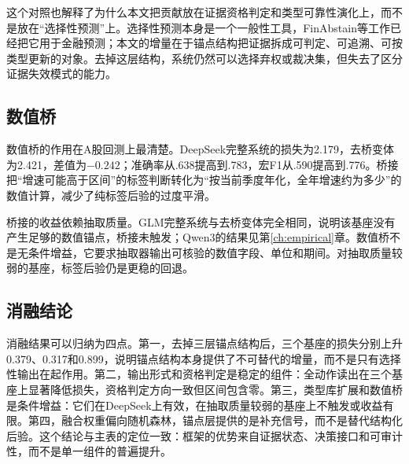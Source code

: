这个对照也解释了为什么本文把贡献放在证据资格判定和类型可靠性演化上，而不是放在“选择性预测”上。选择性预测本身是一个一般性工具，FinAbstain等工作已经把它用于金融预测；本文的增量在于锚点结构把证据拆成可判定、可追溯、可按类型更新的对象。去掉这层结构，系统仍然可以选择弃权或裁决集，但失去了区分证据失效模式的能力。

\subsection{数值桥}

数值桥的作用在A股回测上最清楚。DeepSeek完整系统的损失为2.179，去桥变体为2.421，差值为$-0.242$；准确率从.638提高到.783，宏F1从.590提高到.776。桥接把“增速可能高于区间”的标签判断转化为“按当前季度年化，全年增速约为多少”的数值计算，减少了纯标签后验的过度平滑。

桥接的收益依赖抽取质量。GLM完整系统与去桥变体完全相同，说明该基座没有产生足够的数值锚点，桥接未触发；Qwen3的结果见第\ref{ch:empirical}章。数值桥不是无条件增益，它要求抽取器输出可核验的数值字段、单位和期间。对抽取质量较弱的基座，标签后验仍是更稳的回退。

\subsection{消融结论}

消融结果可以归纳为四点。第一，去掉三层锚点结构后，三个基座的损失分别上升0.379、0.317和0.899，说明锚点结构本身提供了不可替代的增量，而不是只有选择性输出在起作用。第二，输出形式和资格判定是稳定的组件：全动作读出在三个基座上显著降低损失，资格判定方向一致但区间包含零。第三，类型库扩展和数值桥是条件增益：它们在DeepSeek上有效，在抽取质量较弱的基座上不触发或收益有限。第四，融合权重偏向随机森林，锚点层提供的是补充信号，而不是替代结构化后验。这个结论与主表的定位一致：框架的优势来自证据状态、决策接口和可审计性，而不是单一组件的普遍提升。
